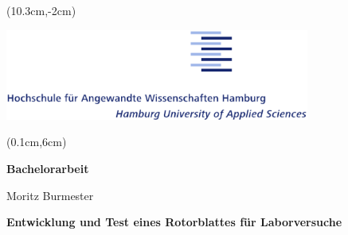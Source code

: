 {
\begin{titlepage}
  



\setlength{\parindent}{-2.5cm} %

\begin{textblock*}{\textwidth}(10.3cm,-2cm)
  \begin{minipage}[r]{\textwidth}
    \includegraphics[width=10cm]{figures/HAW_logo.eps}%
   \end{minipage}
\end{textblock*}

\begin{textblock*}{\paperwidth}(0.1cm,6cm)
  \colorbox{HAWBannerColor}{
    \begin{minipage}[l][9,6cm][c]{\paperwidth}%
       \hspace*{0.25\textwidth}
       \parbox[t]{0.635\textwidth}{
        {\begin{flushright}
       
          \vspace{1cm}
        {\bfseries\huge Bachelorarbeit}

        \vspace{2cm}
         \Large Moritz Burmester

        \vspace{0.5cm}
         {\bfseries\LARGE Entwicklung und Test eines Rotorblattes für Laborversuche}
        \end{flushright}
        }}%
   \end{minipage}
    }
  \end{textblock*}


\end{titlepage}}
